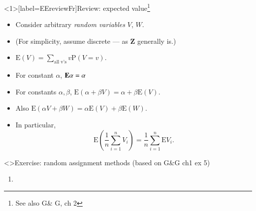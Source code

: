\begin{frame}<1>[label=EEreviewFr]{Review: expected value\footnote{See also G\& G, ch 2}}

  \begin{itemize}
  \item Consider arbitrary \textit{random variables} $V$, $W$.
  \item (For simplicity, assume discrete --- as $\mathbf{Z}$ generally is.)
  \item  $\mathrm{E}(V) = \sum_{\mbox{all v's}} v\mathrm{P}(V=v) $.
  \item<2-> For constant $\alpha$, $\mathbf{E}  \alpha = \alpha$
  \item<2-> For constants $\alpha, \beta$, $\mathrm{E}(\alpha + \beta V) =
    \alpha + \beta\mathrm{E}(V)$.
  \item<2-> Also $\mathrm{E}(\alpha V + \beta W) = \alpha \mathrm{E}(V) + \beta \mathrm{E}(W)$. 
  \item<3-> In particular, 
$$\mathrm{E}\left(\frac{1}{n} \sum_{i=1}^n V_i\right) = \frac{1}{n} \sum_{i=1}^n \mathrm{E} V_i.$$
  \end{itemize}


\end{frame}

\begin{frame}<\nottheirhandout>{Exercise: random assignment methods}
{\footnotesize (based on G\&G ch1 ex 5)}

\begin{enumerate} \addtocounter{enumi}{8}
\item

\end{enumerate}

\end{frame}





